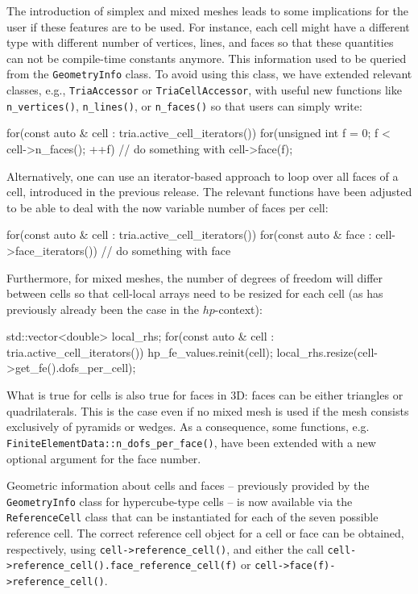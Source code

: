 \documentclass{ansarticle-preprint}
\begin{document}
The introduction of simplex and mixed meshes leads to some implications
for the user if these features are to be used. For instance, each cell might have a different type with
different number of vertices, lines, and faces so that these quantities can not be
compile-time constants anymore. This information used to be queried from
the \texttt{GeometryInfo} class. To avoid using this class, we have extended
relevant classes, e.g., \texttt{TriaAccessor} or \texttt{TriaCellAccessor},
with useful new functions like \texttt{n\_vertices()}, \texttt{n\_lines()}, or
\texttt{n\_faces()} so that users can simply write:
\begin{c++}
for(const auto & cell : tria.active_cell_iterators())
  for(unsigned int f = 0; f < cell->n_faces(); ++f)
    // do something with cell->face(f);
\end{c++}
Alternatively, one can use an iterator-based approach to loop over all faces
of a cell, introduced in the previous release. The relevant functions have been adjusted to be able to deal with
the now variable number of faces per cell:
\begin{c++}
for(const auto & cell : tria.active_cell_iterators())
  for(const auto & face : cell->face_iterators())
    // do something with face
\end{c++}
Furthermore, for mixed meshes, the number of degrees of freedom will differ between cells so that
cell-local arrays need to be resized for each
cell (as has previously already been the case in the $hp$-context):
\begin{c++}
std::vector<double> local_rhs;
for(const auto & cell : tria.active_cell_iterators())
 {
   hp_fe_values.reinit(cell);
   local_rhs.resize(cell->get_fe().dofs_per_cell);
 }
\end{c++}


What is true for cells is also true for faces in 3D: faces can be either triangles
or quadrilaterals. This is the case even if no mixed mesh is used if
the mesh consists exclusively of pyramids or wedges. As a consequence, some functions, e.g. \texttt{FiniteElementData::n\_dofs\_per\_face()}, have been extended with a new optional argument for the face number.

Geometric information about cells and faces -- previously provided by
the \texttt{GeometryInfo} class for hypercube-type cells -- is now
available via the  \texttt{ReferenceCell} class that can be
instantiated for each of the seven possible reference cell. The
correct reference cell object for a cell or face can be obtained, respectively, using
\texttt{cell->reference\_cell()}, and either the call
\texttt{cell->reference\_cell().face\_reference\_cell(f)}
or
\texttt{cell->face(f)->reference\_cell()}.
\end{document}
